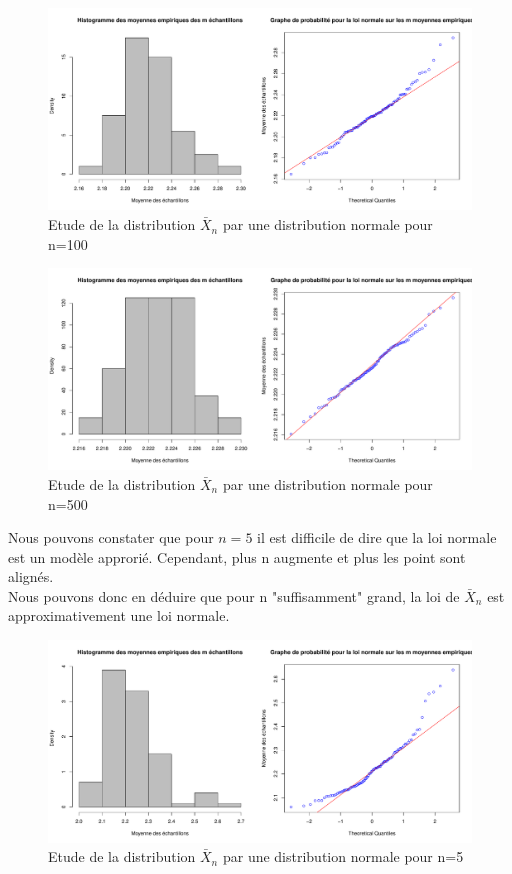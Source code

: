 \documentclass[12pt]{article}
\begin{document}
\begin{enumerate}
\begin{figure}[!h]
\centering
\includegraphics[width=1.0\textwidth]{figures/GraphP2Q54.pdf}
\caption{Etude de la distribution $\bar X_n$ par une distribution normale pour n=100}
\end{figure}

\begin{figure}[!h]
\centering
\includegraphics[width=1.0\textwidth]{figures/GraphP2Q55.pdf}
\caption{Etude de la distribution $\bar X_n$ par une distribution normale pour n=500}
\end{figure}
Nous pouvons constater que pour $n=5$ il est difficile de dire que la loi normale est un mod\`{e}le approri\'{e}. Cependant, plus n augmente et plus les point sont align\'{e}s. 
\\ 
Nous pouvons donc en d\'{e}duire que pour n "suffisamment" grand, la loi de $\bar X_n$ est approximativement une loi normale.
\begin{figure}[!h]
\centering
\includegraphics[width=1.0\textwidth]{figures/GraphP2Q51.pdf}
\caption{Etude de la distribution $\bar X_n$ par une distribution normale pour n=5}
\end{figure}


\end{enumerate}
\end{document}
